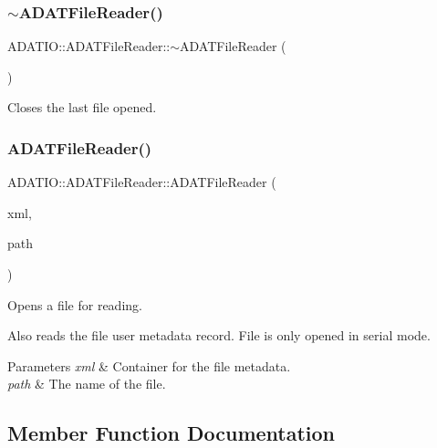 \subsubsection{\texorpdfstring{$\sim$ADATFileReader()}{~ADATFileReader()}}
{\footnotesize\ttfamily A\+D\+A\+T\+I\+O\+::\+A\+D\+A\+T\+File\+Reader\+::$\sim$\+A\+D\+A\+T\+File\+Reader (\begin{DoxyParamCaption}{ }\end{DoxyParamCaption})}



Closes the last file opened. 

\mbox{\label{classADATIO_1_1ADATFileReader_ga096a7060d69fd109067404e75f8a06ee}} 
\subsubsection{\texorpdfstring{ADATFileReader()}{ADATFileReader()}\hspace{0.1cm}{\footnotesize\ttfamily [2/2]}}
{\footnotesize\ttfamily A\+D\+A\+T\+I\+O\+::\+A\+D\+A\+T\+File\+Reader\+::\+A\+D\+A\+T\+File\+Reader (\begin{DoxyParamCaption}\item[{\mbox{\hyperlink{classADATXML_1_1XMLReader}{X\+M\+L\+Reader}} \&}]{xml,  }\item[{const std\+::string \&}]{path }\end{DoxyParamCaption})}



Opens a file for reading. 

Also reads the file user metadata record. File is only opened in serial mode. 
\begin{DoxyParams}{Parameters}
{\em xml} & Container for the file metadata. \\
\hline
{\em path} & The name of the file. \\
\hline
\end{DoxyParams}


\subsection{Member Function Documentation}
\mbox{\label{classADATIO_1_1ADATFileReader_gaddf83cb612ce869fe7a0a5f7e559fe72}} 

